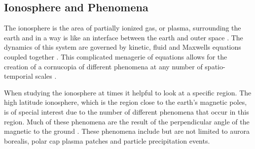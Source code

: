 \subsection{Ionosphere and Phenomena}
The ionosphere is the area of partially ionized gas, or plasma, surrounding the earth and in a way is like an interface between the earth and outer space \cite{kellybook}. The dynamics of this system are governed by kinetic, fluid and Maxwells equations coupled together \cite{schunk2004ionospheres}. This complicated menagerie of equations allows for the creation of a cornucopia of different phenomena at any number of spatio-temporial scales \cite{Semeter:2008hs,Semeter2009738}.


%
% 
%

When studying the ionosphere at times it helpful to look at a specific region. The high latitude ionosphere, which is the region close to the earth's magnetic poles, is of special interest due to the number of different phenomena that occur in this region. Much of these phenomena are the result of the perpendicular angle of the magnetic to the ground \cite{schunk2004ionospheres}. These phenomena include but are not limited to aurora borealis, polar cap plasma patches and particle precipitation events. 

